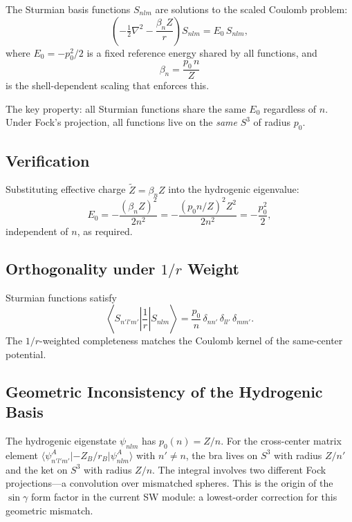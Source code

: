 \documentclass[aps,pra,twocolumn,superscriptaddress,longbibliography]{revtex4-2}
\theoremstyle{remark}
\theoremstyle{plain}
\begin{document}
The Sturmian basis functions $S_{nlm}$ are solutions to the scaled
Coulomb problem:
\begin{equation}
\left(-\tfrac{1}{2}\nabla^2 - \frac{\beta_n Z}{r}\right) S_{nlm}
  = E_0\, S_{nlm},
\label{eq:sturmian_eq}
\end{equation}
where $E_0 = -p_0^2/2$ is a fixed reference energy shared by all
functions, and
\begin{equation}
\beta_n = \frac{p_0\, n}{Z}
\label{eq:beta_n}
\end{equation}
is the shell-dependent scaling that enforces this.

The key property: all Sturmian functions share the same $E_0$
regardless of $n$.  Under Fock's projection, all functions live on
the \emph{same} $S^3$ of radius $p_0$.

\subsection{Verification}

Substituting effective charge $\tilde{Z} = \beta_n Z$ into the
hydrogenic eigenvalue:
\begin{equation}
E_0 = -\frac{(\beta_n Z)^2}{2n^2}
     = -\frac{(p_0 n / Z)^2 Z^2}{2n^2}
     = -\frac{p_0^2}{2},
\label{eq:sturmian_verify}
\end{equation}
independent of $n$, as required.

\subsection{Orthogonality under $1/r$ Weight}

Sturmian functions satisfy
\begin{equation}
\left\langle S_{n'l'm'}\left|\frac{1}{r}\right| S_{nlm}\right\rangle
  = \frac{p_0}{n}\,\delta_{nn'}\,\delta_{ll'}\,\delta_{mm'}.
\label{eq:sturmian_orthog}
\end{equation}
The $1/r$-weighted completeness matches the Coulomb kernel of the
same-center potential.

\subsection{Geometric Inconsistency of the Hydrogenic Basis}

The hydrogenic eigenstate $\psi_{nlm}$ has $p_0(n) = Z/n$.  For
the cross-center matrix element
$\langle \psi^A_{n'l'm'} | {-Z_B/r_B} | \psi^A_{nlm} \rangle$
with $n' \neq n$, the bra lives on $S^3$ with radius $Z/n'$ and the
ket on $S^3$ with radius $Z/n$.  The integral involves two different
Fock projections---a convolution over mismatched spheres.  This is
the origin of the $\sin\gamma$ form factor in the current SW module:
a lowest-order correction for this geometric mismatch.
\end{document}
